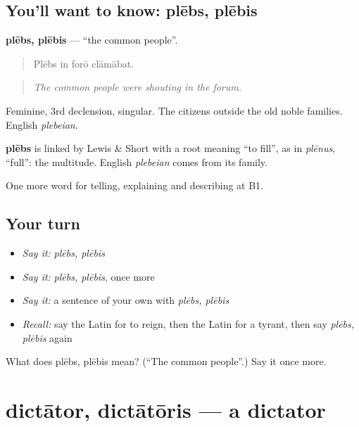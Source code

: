 \subsection*{You'll want to know: plēbs, plēbis}
\textbf{plēbs, plēbis} — \textquotedblleft{}the common people\textquotedblright{}.

\begin{quote}
Plēbs in forō clāmābat.
\end{quote}

\begin{quote}
\emph{The common people were shouting in the forum.}
\end{quote}

Feminine, 3rd declension, singular. The citizens outside the old noble families. English \emph{plebeian}.

\begin{cousinweb}
\textbf{plēbs} is linked by Lewis \& Short with a root meaning \textquotedblleft{}to fill\textquotedblright{}, as in \emph{plēnus}, \textquotedblleft{}full\textquotedblright{}: the multitude. English \emph{plebeian} comes from its family.
\end{cousinweb}

\begin{grammarlens}[title={What you've built}]
One more word for telling, explaining and describing at B1.
\end{grammarlens}

\subsection*{Your turn}
\begin{itemize}
\raggedright
  \item \emph{Say it:} \emph{plēbs, plēbis}
  \item \emph{Say it:} \emph{plēbs, plēbis}, once more
  \item \emph{Say it:} a sentence of your own with \emph{plēbs, plēbis}
  \item \emph{Recall:} say the Latin for to reign, then the Latin for a tyrant, then say \emph{plēbs, plēbis} again
\end{itemize}

\begin{tcolorbox}[breakable,colback=teal!4,colframe=teal!35!black,title={Before you move on}]
What does plēbs, plēbis mean? (\textquotedblleft{}The common people\textquotedblright{}.) Say it once more.
\end{tcolorbox}
\section[dictātor, dictātōris]{dictātor, dictātōris — a dictator}

